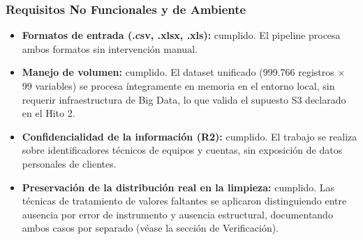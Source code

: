 \documentclass[12pt,a4paper]{article}
\begin{document}
\subsubsection*{Requisitos No Funcionales y de Ambiente}
 
\begin{itemize}
    \item \textbf{Formatos de entrada (.csv, .xlsx, .xls):} cumplido. El pipeline procesa ambos formatos sin intervención manual.
 
    \item \textbf{Manejo de volumen:} cumplido. El dataset unificado (999.766 registros $\times$ 99 variables) se procesa íntegramente en memoria en el entorno local, sin requerir infraestructura de Big Data, lo que valida el supuesto S3 declarado en el Hito 2.
 
    \item \textbf{Confidencialidad de la información (R2):} cumplido. El trabajo se realiza sobre identificadores técnicos de equipos y cuentas, sin exposición de datos personales de clientes.
 
    \item \textbf{Preservación de la distribución real en la limpieza:} cumplido. Las técnicas de tratamiento de valores faltantes se aplicaron distinguiendo entre ausencia por error de instrumento y ausencia estructural, documentando ambos casos por separado (véase la sección de Verificación).
\end{itemize}
\end{document}

